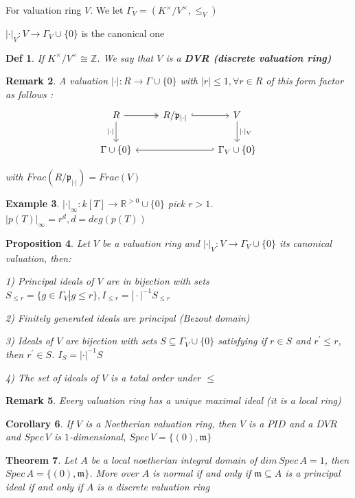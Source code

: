 \documentclass{article}
\newtheorem{theorem}{Theorem}[section]
\newtheorem{definition}[theorem]{Def}
\newtheorem{corollary}[theorem]{Corollary}
\newtheorem{example}[theorem]{Example}
\newtheorem{proposition}[theorem]{Proposition}
\newtheorem{remark}[theorem]{Remark}
\begin{document}
For valuation ring $V$. We let $\Gamma_V=(K^\times/V^\times,\leq_V)$

$|\cdot|_V:V\to\Gamma_V\cup\{0\}$ is the canonical one

\begin{definition}
    If $K^\times / V^\times \cong \mathbb Z$. We say that $V$ is a \textbf{DVR (discrete valuation ring)}
\end{definition}

\begin{remark}
    A valuation $|\cdot|:R\to \Gamma\cup \{0\}$ with $|r|\leq1,\forall r\in R$ of this form factor as follows :
\[\begin{tikzcd}
	R & {R/\mathfrak p_{|\cdot|}} & V \\
	{\Gamma\cup\{0\}} && {\Gamma_V\cup\{0\}}
	\arrow["{|\cdot|_V}", from=1-3, to=2-3]
	\arrow[two heads, from=1-1, to=1-2]
	\arrow[hook, from=1-2, to=1-3]
	\arrow[hook', from=2-3, to=2-1]
	\arrow["{|\cdot|}"', from=1-1, to=2-1]
\end{tikzcd}\]

with $Frac(R/\mathfrak p_{|\cdot|}) = Frac(V)$
\end{remark}

\begin{example}
    $|\cdot|_\infty : k[T]\to \mathbb R^{>0} \cup \{0\}$ pick $r>1$. $|p(T)|_\infty=r^d,d=deg(p(T))$
\end{example}

\begin{proposition}
    Let $V$ be a valuation ring and $|\cdot|_V : V\to \Gamma_V\cup\{0\}$ its canonical valuation, then:

    1) Principal ideals of $V$ are in bijection with sets $S_{\leq r}=\{g\in \Gamma_V|g\leq r\},I_{\leq r}=|\cdot|^{-1}S_{\leq r}$

    2) Finitely generated ideals are principal (Bezout domain)

    3) Ideals of $V$ are bijection with sets $S\subseteq \Gamma_V\cup\{0\}$ satisfying if $r\in S$ and $r^\prime\leq r$, then $r^\prime\in S$. $I_{S}=|\cdot|^{-1}S$

    4) The set of ideals of $V$ is a total order under $\leq$
\end{proposition}

\begin{remark}
    Every valuation ring has a unique maximal ideal (it is a local ring)
\end{remark}

\begin{corollary}
    If $V$ is a Noetherian valuation ring, then $V$ is a $PID$ and a $DVR$ and $Spec\, V$ is $1$-dimensional, $Spec\,V=\{(0),\mathfrak m\}$
\end{corollary}
\begin{theorem}
Let $A$ be a local noetherian integral domain of $dim\, Spec\, A = 1$, then $Spec\,A=\{(0),\mathfrak m\}$.
More over $A$ is normal if and only if $\mathfrak m \subseteq A$ is a principal ideal if and only if $A$ is a discrete valuation
ring
\end{theorem}
\end{document}
